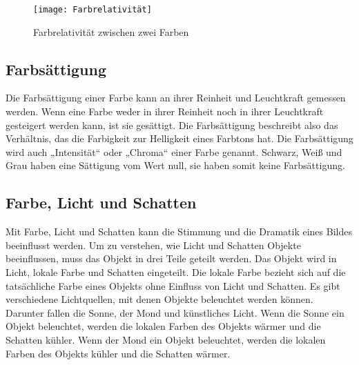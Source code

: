 \begin{figure}[H]
	\centering
	\texttt{[image: Farbrelativität]}
	\caption{Farbrelativität zwischen zwei Farben\cite{mollica2018special}}
\end{figure}

\subsection{Farbsättigung}
Die Farbsättigung einer Farbe kann an ihrer Reinheit und Leuchtkraft gemessen werden. Wenn eine Farbe weder in ihrer Reinheit noch in ihrer Leuchtkraft gesteigert werden kann, ist sie gesättigt. Die Farbsättigung beschreibt also das Verhältnis, das die Farbigkeit zur Helligkeit eines Farbtons hat. Die Farbsättigung wird auch „Intensität“ oder „Chroma“ einer Farbe genannt. Schwarz, Weiß und Grau haben eine Sättigung vom Wert null, sie haben somit keine Farbsättigung. 
\cite{mollica2018special}

\subsection{Farbe, Licht und Schatten}
Mit Farbe, Licht und Schatten kann die Stimmung und die Dramatik eines Bildes beeinflusst werden. Um zu verstehen, wie Licht und Schatten Objekte beeinflussen, muss das Objekt in drei Teile geteilt werden. Das Objekt wird in Licht, lokale Farbe und Schatten eingeteilt. Die lokale Farbe bezieht sich auf die tatsächliche Farbe eines Objekts ohne Einfluss von Licht und Schatten. Es gibt verschiedene Lichtquellen, mit denen Objekte beleuchtet werden können. Darunter fallen die Sonne, der Mond und künstliches Licht. Wenn die Sonne ein Objekt beleuchtet, werden die lokalen Farben des Objekts wärmer und die Schatten kühler. Wenn der Mond ein Objekt beleuchtet, werden die lokalen Farben des Objekts kühler und die Schatten wärmer.
\cite{mollica2018special}

